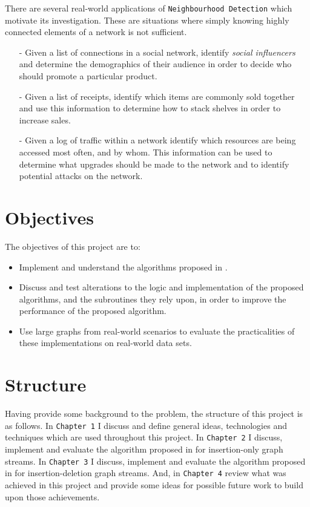 \documentclass[11pt,twoside,a4paper]{report}
\begin{document}
There are several real-world applications of \texttt{Neighbourhood Detection} which motivate its investigation. These are situations where simply knowing highly connected elements of a network is not sufficient.
\begin{itemize}
	\item[-] Given a list of connections in a social network, identify \textit{social influencers} and determine the demographics of their audience in order to decide who should promote a particular product.
	\item[-] Given a list of receipts, identify which items are commonly sold together and use this information to determine how to stack shelves in order to increase sales.
	\item[-] Given a log of traffic within a network identify which resources are being accessed most often, and by whom. This information can be used to determine what upgrades should be made to the network and to identify potential attacks on the network.
\end{itemize}

\section{Objectives}
The objectives of this project are to:
\begin{itemize}
	\item Implement and understand the algorithms proposed in \cite{orig}.
  \item Discuss and test alterations to the logic and implementation of the proposed algorithms, and the subroutines they rely upon, in order to improve the performance of the proposed algorithm.
	\item Use large graphs from real-world scenarios to evaluate the practicalities of these implementations on real-world data sets.
\end{itemize}

\section{Structure}
Having provide some background to the problem, the structure of this project is as follows. In \texttt{Chapter 1} I discuss and define general ideas, technologies and techniques which are used throughout this project. In \texttt{Chapter 2} I discuss, implement and evaluate the algorithm proposed in \cite{orig} for insertion-only graph streams. In \texttt{Chapter 3} I discuss, implement and evaluate the algorithm proposed in \cite{orig} for insertion-deletion graph streams. And, in \texttt{Chapter 4} review what was achieved in this project and provide some ideas for possible future work to build upon those achievements.
\end{document}
